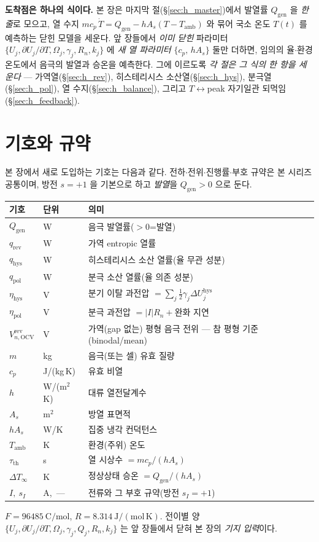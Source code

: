 \documentclass[11pt,a4paper]{article}
\newcommand{\OCV}{\mathrm{OCV}}
\newcommand{\hys}{\mathrm{hys}}
\newcommand{\pol}{\mathrm{pol}}
\newcommand{\rev}{\mathrm{rev}}
\newcommand{\gen}{\mathrm{gen}}
\newcommand{\amb}{\mathrm{amb}}
\newcommand{\Th}{\mathrm{th}}
\begin{document}
\textbf{도착점은 하나의 식이다.} 본 장은 마지막 절(\S\ref{sec:h_master})에서 발열률 $Q_\gen$ 을 \emph{한 줄}로
모으고, 열 수지 $m c_p\,\dot T=Q_\gen-hA_s(T-T_\amb)$ 와 묶어 국소 온도 $T(t)$ 를 예측하는 닫힌 모델을 세운다. 앞
장들에서 \emph{이미 닫힌} 파라미터 $\{U_j,\partial U_j/\partial T,\Omega_j,\gamma_j,R_n,k_j\}$ 에 \emph{새 열
파라미터} $\{c_p,\,hA_s\}$ 둘만 더하면, 임의의 율$\cdot$환경 온도에서 음극의 발열과 승온을 예측한다. 그에 이르도록
\emph{각 절은 그 식의 한 항을 세운다} — 가역열(\S\ref{sec:h_rev}), 히스테리시스 소산열(\S\ref{sec:h_hys}),
분극열(\S\ref{sec:h_pol}), 열 수지(\S\ref{sec:h_balance}), 그리고 $T\leftrightarrow$peak 자기일관 되먹임
(\S\ref{sec:h_feedback}).

\tableofcontents
\newpage

\section{기호와 규약}\label{sec:h_notation}
본 장에서 새로 도입하는 기호는 다음과 같다. 전하$\cdot$전위$\cdot$진행률$\cdot$부호 규약은 본 시리즈 공통이며,
방전 $s=+1$ 을 기본으로 하고 \emph{발열}을 $Q_\gen>0$ 으로 둔다.
\begin{longtable}{p{} p{} >{\raggedright\arraybackslash}p{}}
\toprule 기호 & 단위 & 의미 \\ \midrule \endhead
$Q_\gen$ & W & 음극 발열률($>0$=발열) \\
$q_\rev$ & W & 가역 entropic 열률 \\
$q_\hys$ & W & 히스테리시스 소산 열률(율 무관 성분) \\
$q_\pol$ & W & 분극 소산 열률(율 의존 성분) \\
$\eta_\hys$ & V & 분기 이탈 과전압 $=\sum_j\tfrac12\gamma_j\Delta U_j^\hys$ \\
$\eta_\pol$ & V & 분극 과전압 $=|I|R_n+$완화 지연 \\
$V_{n,\OCV}^\rev$ & V & 가역(gap 없는) 평형 음극 전위 — 참 평형 기준(binodal/mean) \\
$m$ & kg & 음극(또는 셀) 유효 질량 \\
$c_p$ & J/(kg\,K) & 유효 비열 \\
$h$ & W/(m$^2$K) & 대류 열전달계수 \\
$A_s$ & m$^2$ & 방열 표면적 \\
$hA_s$ & W/K & 집중 냉각 컨덕턴스 \\
$T_\amb$ & K & 환경(주위) 온도 \\
$\tau_\Th$ & s & 열 시상수 $=mc_p/(hA_s)$ \\
$\Delta T_\infty$ & K & 정상상태 승온 $=Q_\gen/(hA_s)$ \\
$I,\ s_I$ & A,\ --- & 전류와 그 부호 규약(방전 $s_I=+1$) \\
\bottomrule
\end{longtable}
$F=96485\ \mathrm{C/mol}$, $R=8.314\ \mathrm{J/(mol\,K)}$. 전이별 양 $\{U_j,\partial U_j/\partial T,\Omega_j,
\gamma_j,Q_j,R_n,k_j\}$ 는 앞 장들에서 닫혀 본 장의 \emph{기지 입력}이다.
\end{document}
